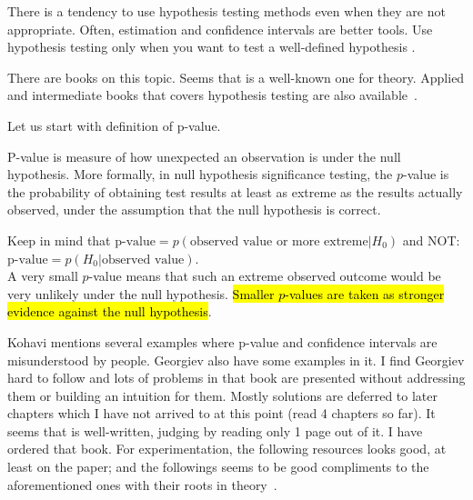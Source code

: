 \begin{tcolorbox}[colback=aliceblue!10!white,colframe=blue!70!black,title=\textbf{Remark}]
There is a tendency to use hypothesis testing methods even
when they are not appropriate. Often, estimation and confidence intervals are
better tools. Use hypothesis testing only when you want to test a well-defined
hypothesis \citep{wasserman2004all}.
\end{tcolorbox}


There are books on this topic.
Seems that \citep{lehmann2005testing} is a well-known one
for theory. Applied and intermediate books that covers hypothesis 
testing are also available~\citep{casella2024statistical,montgomery2017design,wackerly2008mathematical}.

Let us start with definition of p-value. 
\begin{deff}
P-value is measure of how unexpected an observation is under the null hypothesis.
More formally, in null hypothesis significance testing, the $p$-value is the probability 
of obtaining test results at least as extreme as the results 
actually observed, under the assumption that the null hypothesis is 
correct.
\end{deff}

Keep in mind that $\text{p-value} = p(\text{observed value or more extreme} | H_0)$
and NOT: $\text{p-value} = p(H_0 | \text{observed value})$.\\

A very small $p$-value means that such an extreme observed 
outcome would be very unlikely under the null hypothesis.
\hl{Smaller $p$-values are taken as stronger evidence against the null hypothesis}.

Kohavi\cite{kohaviABBuster} mentions several examples where
p-value and confidence intervals are misunderstood by people.
Georgiev\cite{georgiev2019} also have some examples in it.
I find Georgiev hard to follow and lots of problems in that book
are presented without addressing them or building an intuition for them.
Mostly solutions are deferred to later chapters which I have 
not arrived to at this point (read 4 chapters so far).
It seems that \citep{kohavi2020trustworthy} is well-written, judging by
reading only 1 page out of it. I have ordered that book.
For experimentation, the following resources looks good,
at least on the paper; \citep{montgomery2017design,box2005statistics}
and the followings seems to be good compliments to the aforementioned ones
with their roots in theory~\citep{wackerly2008mathematical,lehmann2005testing}.

